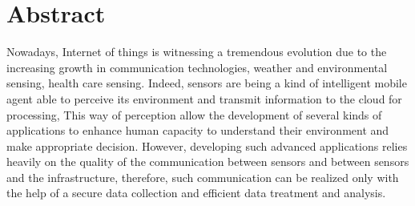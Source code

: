 \chapter*{Abstract}

Nowadays,
	Internet of things is witnessing a tremendous evolution due to the increasing growth in communication technologies,
	weather and environmental sensing, health care sensing.
Indeed,
	sensors are being a kind of intelligent mobile agent able to perceive its environment and transmit information to the cloud for processing,
This way of perception allow the development of several kinds of applications to enhance human capacity to understand their environment and make appropriate decision.
However,
	developing such advanced applications relies heavily on the quality of the communication between sensors and between sensors and the infrastructure,
	therefore,
	such communication can be realized only with the help of a secure data collection and efficient data treatment and analysis.

